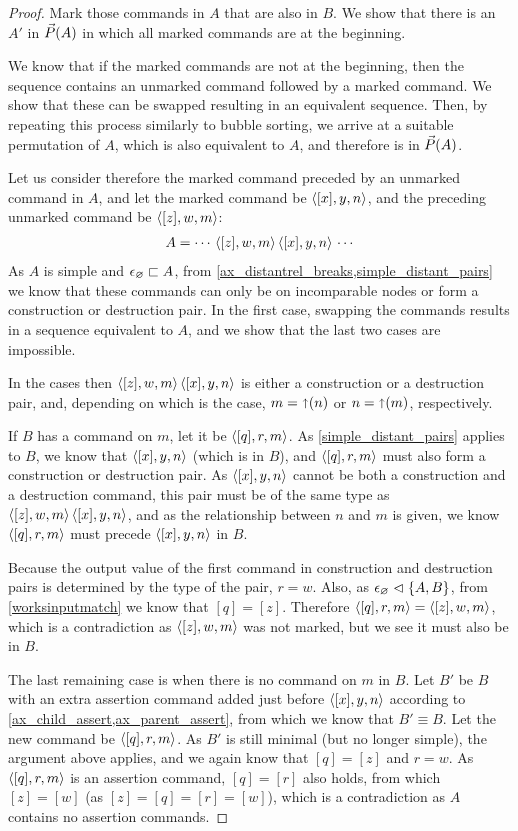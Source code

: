 \begin{proof}
Mark those commands in $A$ that are also in $B$.
We show that
there is an $A'$ in $\vec{P}({A})$ in which all marked commands are at the beginning.

We know that if the marked commands are not at the beginning, then
the sequence contains an unmarked command followed by a marked command.
We show that these can be swapped resulting in an equivalent sequence.
Then, by repeating this process similarly to bubble sorting, we arrive at 
a suitable permutation of $A$, which is also equivalent to $A$, and therefore is in $\vec{P}({A})$.

Let us consider therefore the marked command preceded by an unmarked command in $A$,
and let the marked command be $\langle{[x],y,n}\rangle$, 
and the preceding unmarked command be $\langle{[z],w,m}\rangle$:
\begin{gather*}
A = \cdots\,  \langle{[z],w,m}\rangle\,  \langle{[x],y,n}\rangle\,  \cdots
\end{gather*}
As $A$ is simple and $\epsilon_\varnothing\sqsubset{A}$, from 
\cref{ax_distantrel_breaks,simple_distant_pairs}
we know that these commands can only be on incomparable nodes or form a construction or destruction pair.
In the first case, swapping the commands results in a sequence equivalent to $A$,
and we show that the last two cases are impossible.

In the cases then $\langle{[z],w,m}\rangle\,\langle{[x],y,n}\rangle$ is either a construction or a destruction pair,
and, depending on which is the case,
$m=\mathord{\shortuparrow}(n)$ or $n=\mathord{\shortuparrow}(m)$, respectively.

If $B$ has a command on $m$, let it be $\langle{[q],r,m}\rangle$.
As \cref{simple_distant_pairs} applies to $B$, we know that
$\langle{[x],y,n}\rangle$ (which is in $B$), and $\langle{[q],r,m}\rangle$ must also form a construction
or destruction pair.
As $\langle{[x],y,n}\rangle$ cannot be both a construction and a destruction command,
this pair must be of the same type as $\langle{[z],w,m}\rangle\,\langle{[x],y,n}\rangle$,
and as the relationship between $n$ and $m$ is given,
we know $\langle{[q],r,m}\rangle$ must precede $\langle{[x],y,n}\rangle$ in $B$.

Because the output value of the first command in construction
and destruction pairs is determined by the type of the pair,
$r=w$.
Also, as ${\epsilon_\varnothing}\vartriangleleft{\{{A,B}\}}$, 
from \cref{worksinputmatch}
we know that $[q]=[z]$.
Therefore $\langle{[q],r,m}\rangle=\langle{[z],w,m}\rangle$,
which is a contradiction as $\langle{[z],w,m}\rangle$ was not marked,
but we see it must also be in $B$.

The last remaining case is when there is no command on $m$ in $B$.
Let $B'$ be $B$
with an extra assertion command added just before $\langle{[x],y,n}\rangle$
according to \cref{ax_child_assert,ax_parent_assert}, 
from which we know that $B'\equiv B$.
Let the new command be $\langle{[q],r,m}\rangle$.
As $B'$ is still minimal (but no longer simple),
the argument above applies, and we again know
that $[q]=[z]$ and $r=w$.
As $\langle{[q],r,m}\rangle$ is an assertion command, $[q]=[r]$ also holds,
from which $[z]=[w]$ (as $[z]=[q]=[r]=[w]$), which is a contradiction
as $A$ contains no assertion commands.
\end{proof}


